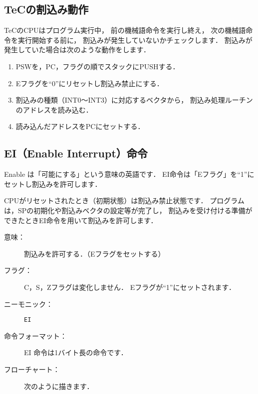 \subsection{TeCの割込み動作}
TeCのCPUはプログラム実行中，
前の機械語命令を実行し終え，
次の機械語命令を実行開始する前に，
割込みが発生していないかチェックします．
割込みが発生していた場合は次のような動作をします．

\begin{enumerate}
\item PSWを，PC，フラグの順でスタックにPUSHする．
\item Eフラグを``0''にリセットし割込み禁止にする．
\item 割込みの種類（INT0〜INT3）に対応するベクタから，
割込み処理ルーチンのアドレスを読み込む．
\item 読み込んだアドレスをPCにセットする．
\end{enumerate}

\subsection{EI（Enable Interrupt）命令}
Enable は「可能にする」という意味の英語です．
EI命令は「Eフラグ」を``1''にセットし割込みを許可します．

CPUがリセットされたとき（初期状態）は割込み禁止状態です．
プログラムは，SPの初期化や割込みベクタの設定等が完了し，
割込みを受け付ける準備ができたときEI命令を用いて割込みを許可します．

\begin{description}
\item[意味：]割込みを許可する．（Eフラグをセットする）

\item[フラグ：]C，S，Zフラグは変化しません．
Eフラグが``1''にセットされます．

\item[ニーモニック：] {\tt EI}

\item[命令フォーマット：]EI 命令は1バイト長の命令です．


\item[フローチャート：]
次のように描きます．

\begin{center}
\end{center}

\end{description}

